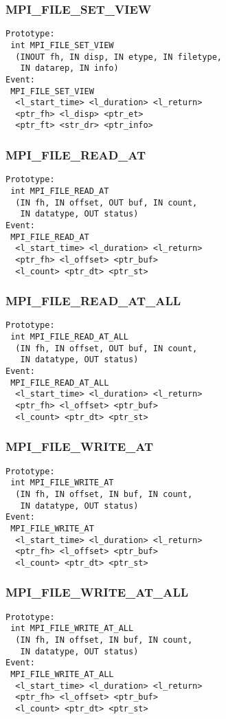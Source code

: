\documentclass{article}
\begin{document}
\subsubsection{MPI\_FILE\_SET\_VIEW}
\label{sec:MPIFILESETVIEW}
\begin{verbatim}
Prototype:
 int MPI_FILE_SET_VIEW
  (INOUT fh, IN disp, IN etype, IN filetype, 
   IN datarep, IN info)
Event:
 MPI_FILE_SET_VIEW 
  <l_start_time> <l_duration> <l_return>
  <ptr_fh> <l_disp> <ptr_et> 
  <ptr_ft> <str_dr> <ptr_info>
\end{verbatim}

\subsubsection{MPI\_FILE\_READ\_AT}
\label{sec:MPIFILEREADAT}
\begin{verbatim}
Prototype:
 int MPI_FILE_READ_AT
  (IN fh, IN offset, OUT buf, IN count, 
   IN datatype, OUT status)
Event:
 MPI_FILE_READ_AT 
  <l_start_time> <l_duration> <l_return>
  <ptr_fh> <l_offset> <ptr_buf>
  <l_count> <ptr_dt> <ptr_st>
\end{verbatim}

\subsubsection{MPI\_FILE\_READ\_AT\_ALL}
\label{sec:MPIFILEREADATALL}
\begin{verbatim}
Prototype:
 int MPI_FILE_READ_AT_ALL
  (IN fh, IN offset, OUT buf, IN count, 
   IN datatype, OUT status)
Event:
 MPI_FILE_READ_AT_ALL 
  <l_start_time> <l_duration> <l_return>
  <ptr_fh> <l_offset> <ptr_buf>
  <l_count> <ptr_dt> <ptr_st>
\end{verbatim}

\subsubsection{MPI\_FILE\_WRITE\_AT}
\label{sec:MPIFILEWRITEAT}
\begin{verbatim}
Prototype:
 int MPI_FILE_WRITE_AT
  (IN fh, IN offset, IN buf, IN count, 
   IN datatype, OUT status)
Event:
 MPI_FILE_WRITE_AT 
  <l_start_time> <l_duration> <l_return>
  <ptr_fh> <l_offset> <ptr_buf>
  <l_count> <ptr_dt> <ptr_st>
\end{verbatim}

\subsubsection{MPI\_FILE\_WRITE\_AT\_ALL}
\label{sec:MPIFILEWRITEATALL}
\begin{verbatim}
Prototype:
 int MPI_FILE_WRITE_AT_ALL
  (IN fh, IN offset, IN buf, IN count, 
   IN datatype, OUT status)
Event:
 MPI_FILE_WRITE_AT_ALL 
  <l_start_time> <l_duration> <l_return>
  <ptr_fh> <l_offset> <ptr_buf>
  <l_count> <ptr_dt> <ptr_st>
\end{verbatim}
\end{document}
